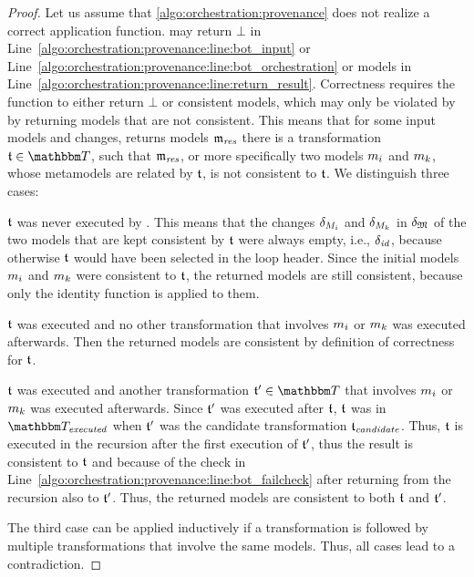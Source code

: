 \begin{proof}
    Let us assume that \autoref{algo:orchestration:provenance} does not realize a correct application function.
     may return $\bot$ in Line~\ref{algo:orchestration:provenance:line:bot_input} or Line~\ref{algo:orchestration:provenance:line:bot_orchestration} or models in Line~\ref{algo:orchestration:provenance:line:return_result}.
    Correctness requires the function to either return $\bot$ or consistent models, which may only be violated by  by returning models that are not consistent.
    This means that for some input models and changes,  returns models $\mathfrak{m}_{\mathit{res}}$ there is a transformation $\transformation{t} \in \transformationset{T}$, such that $\mathfrak{m}_{\mathit{res}}$, or more specifically two models $m_{i}$ and $m_{k}$, 
    whose metamodels are related by $\mathfrak{t}$, is not consistent to $\mathfrak{t}$.
    We distinguish three cases:
    \begin{properenumerate}
        \item $\mathfrak{t}$ was never executed by . This means that the changes $\delta_{M_{i}}$ and $\delta_{M_{k}}$ in $\delta_{\mathfrak{M}}$ of the two models that are kept consistent by $\mathfrak{t}$ were always empty, i.e., $\delta_{\mathit{id}}$, because otherwise $\mathfrak{t}$ would have been selected in the loop header. Since the initial models $m_{i}$ and $m_{k}$ were consistent to $\mathfrak{t}$, the returned models are still consistent, because only the identity function is applied to them.
        \item $\mathfrak{t}$ was executed and no other transformation that involves $m_{i}$ or $m_{k}$ was executed afterwards. Then the returned models are consistent by definition of correctness for $\mathfrak{t}$.
        \item $\mathfrak{t}$ was executed and another transformation $\transformation{t}' \in \transformationset{T}$ that involves $m_{i}$ or $m_{k}$ was executed afterwards.
        Since $\mathfrak{t}'$ was executed after $\mathfrak{t}$, $\mathfrak{t}$ was in $\provalgexecuted$ when $\mathfrak{t}'$ was the candidate transformation $\mathfrak{t}_{\mathit{candidate}}$.
        Thus, $\mathfrak{t}$ is executed in the recursion after the first execution of $\mathfrak{t}'$, thus the result is consistent to $\mathfrak{t}$ and because of the check in Line~\ref{algo:orchestration:provenance:line:bot_failcheck} after returning from the recursion also to $\mathfrak{t}'$. Thus, the returned models are consistent to both $\mathfrak{t}$ and $\mathfrak{t}'$.
    \end{properenumerate}
    The third case can be applied inductively if a transformation is followed by multiple transformations that involve the same models. Thus, all cases lead to a contradiction.
\end{proof}

